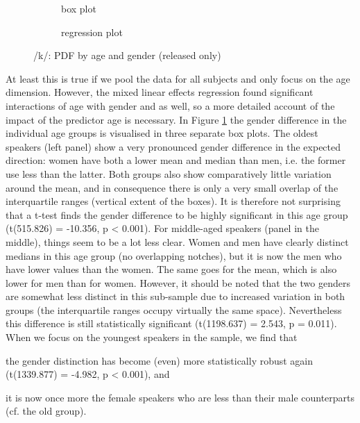 \begin{figure}[h]
	\centering
	\begin{subfigure}{.49\textwidth}
		\centering
			\resizebox{\linewidth}{!}{} 
		\caption{box plot}
		\label{fig.box.k.agegender}
	\end{subfigure}
	\begin{subfigure}{.49\textwidth}
		\centering
			\resizebox{\linewidth}{!}{}
		\caption{regression plot}
		\label{fig.scatter.k.agegender}
	\end{subfigure}
	\caption{/k/: PDF by age and gender (released only)}
\end{figure}

At least this is true if we pool the data for all subjects and only focus on the age dimension.
However, the mixed linear effects regression found significant interactions of age with gender and  as well, so a more detailed account of the impact of the predictor age is necessary.
In Figure \ref{fig.box.k.agegender} the gender difference in the individual age groups is visualised in three separate box plots.
The oldest speakers (left panel) show a very pronounced gender difference in the expected direction: women have both a lower mean and median than men, i.e. the former use less  than the latter.
Both groups also show comparatively little variation around the mean, and in consequence there is only a very small overlap of the interquartile ranges (vertical extent of the boxes).
It is therefore not surprising that a t-test finds the gender difference to be highly significant in this age group (t(515.826) = -10.356, p < 0.001).
For middle-aged speakers (panel in the middle), things seem to be a lot less clear.
Women and men have clearly distinct medians in this age group (no overlapping notches), but it is now the men who have lower  values than the women.
The same goes for the mean, which is also lower for men than for women.
However, it should be noted that the two genders are somewhat less distinct in this sub-sample due to increased variation in both groups (the interquartile ranges occupy virtually the same space).
Nevertheless this difference is still statistically significant (t(1198.637) = 2.543, p = 0.011).
When we focus on the youngest speakers in the sample, we find that
\begin{inparaenum}[(a)]
	\item the gender distinction has become (even) more statistically robust again (t(1339.877) = -4.982, p < 0.001), and
	\item it is now once more the female speakers who are less  than their male counterparts (cf. the old group).
\end{inparaenum}

